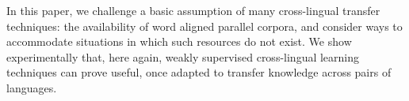 In this paper, we challenge a basic assumption of many cross-lingual transfer techniques: the availability of word aligned parallel corpora, and consider ways to accommodate situations in which such resources do not exist. We show experimentally that, here again, weakly supervised cross-lingual learning techniques can prove useful, once adapted to transfer knowledge across pairs of languages.
